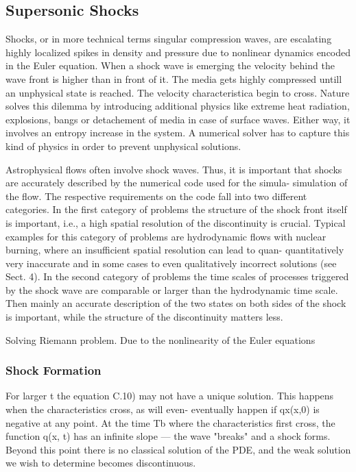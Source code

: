 \subsection{Supersonic Shocks}
Shocks, or in more technical terms singular compression waves, are escalating
highly localized spikes in density and pressure due to nonlinear dynamics
encoded in the Euler equation. When a shock wave is emerging the velocity
behind the wave front is higher than in front of it. The media gets highly
compressed untill an unphysical state is reached. The velocity characteristica
begin to cross. Nature solves this dilemma by introducing additional physics
like extreme heat radiation, explosions, bangs or detachement of media in case
of surface waves. Either way, it involves an entropy increase in the system.
A numerical solver has to capture this kind of physics in order to prevent
unphysical solutions.

Astrophysical flows often involve shock waves. Thus, it is important that
shocks are accurately described by the numerical code used for the simula-
simulation of the flow. The respective requirements on the code fall into two different
categories. In the first category of problems the structure of the shock front
itself is important, i.e., a high spatial resolution of the discontinuity is crucial.
Typical examples for this category of problems are hydrodynamic flows with
nuclear burning, where an insufficient spatial resolution can lead to quan-
quantitatively very inaccurate and in some cases to even qualitatively incorrect
solutions (see Sect. 4). In the second category of problems the time scales
of processes triggered by the shock wave are comparable or larger than the
hydrodynamic time scale. Then mainly an accurate description of the two
states on both sides of the shock is important, while the structure of the
discontinuity matters less.


Solving Riemann problem.
Due to the nonlinearity of the Euler equations 

\subsubsection{Shock Formation}
For larger t the equation C.10) may not have a
unique solution. This happens when the characteristics cross, as will even-
eventually happen if qx(x,0) is negative at any point. At the time Tb where the
characteristics first cross, the function q(x, t) has an infinite slope — the wave
"breaks" and a shock forms. Beyond this point there is no classical solution of
the PDE, and the weak solution we wish to determine becomes discontinuous.

